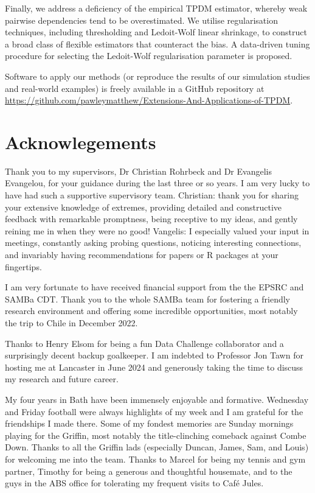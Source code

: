 Finally, we address a deficiency of the empirical TPDM estimator, whereby weak pairwise dependencies tend to be overestimated.
We utilise regularisation techniques, including thresholding and Ledoit-Wolf linear shrinkage, to construct a broad class of flexible estimators that counteract the bias.
A data-driven tuning procedure for selecting the Ledoit-Wolf regularisation parameter is proposed.

Software to apply our methods (or reproduce the results of our simulation studies and real-world examples) is freely available in a GitHub repository at \url{https://github.com/pawleymatthew/Extensions-And-Applications-of-TPDM}.

\newpage

\chapter*{Acknowlegements}

Thank you to my supervisors, Dr Christian Rohrbeck and Dr Evangelis Evangelou, for your guidance during the last three or so years. I am very lucky to have had such a supportive supervisory team. Christian: thank you for sharing your extensive knowledge of extremes, providing detailed and constructive feedback with remarkable promptness, being receptive to my ideas, and gently reining me in when they were no good! Vangelis: I especially valued your input in meetings, constantly asking probing questions, noticing interesting connections, and invariably having recommendations for papers or R packages at your fingertips.
 
I am very fortunate to have received financial support from the the EPSRC and SAMBa CDT. Thank you to the whole SAMBa team for fostering a friendly research environment and offering some incredible opportunities, most notably the trip to Chile in December 2022.

Thanks to Henry Elsom for being a fun Data Challenge collaborator and a surprisingly decent backup goalkeeper. I am indebted to Professor Jon Tawn for hosting me at Lancaster in June 2024 and generously taking the time to discuss my research and future career. 
 
My four years in Bath have been immensely enjoyable and formative. Wednesday and Friday football were always highlights of my week and I am grateful for the friendships I made there. Some of my fondest memories are Sunday mornings playing for the Griffin, most notably the title-clinching comeback against Combe Down. Thanks to all the Griffin lads (especially Duncan, James, Sam, and Louis) for welcoming me into the team. Thanks to Marcel for being my tennis and gym partner, Timothy for being a generous and thoughtful housemate, and to the guys in the ABS office for tolerating my frequent visits to Café Jules. 
 
